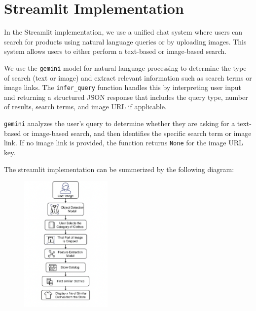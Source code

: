 \vspace{-1.25em}
\section*{Streamlit Implementation}

In the Streamlit implementation, we use a unified chat system where users can search for products using natural language queries or by uploading images. This system allows users to either perform a text-based or image-based search.

\vspace{-1.25em}
We use the \texttt{gemini} model for natural language processing to determine the type of search (text or image) and extract relevant information such as search terms or image links. The \texttt{infer\_query} function handles this by interpreting user input and returning a structured JSON response that includes the query type, number of results, search terms, and image URL if applicable.

\vspace{-1.25em}
\texttt{gemini} analyzes the user's query to determine whether they are asking for a text-based or image-based search, and then identifies the specific search term or image link. If no image link is provided, the function returns \texttt{None} for the image URL key.

\vspace{-1.25em}
The streamlit implementation can be summerized by the following diagram:
\begin{figure}[H]
    \centering
    \includegraphics[width=0.4\textwidth]{images/workflow.png}
\end{figure}